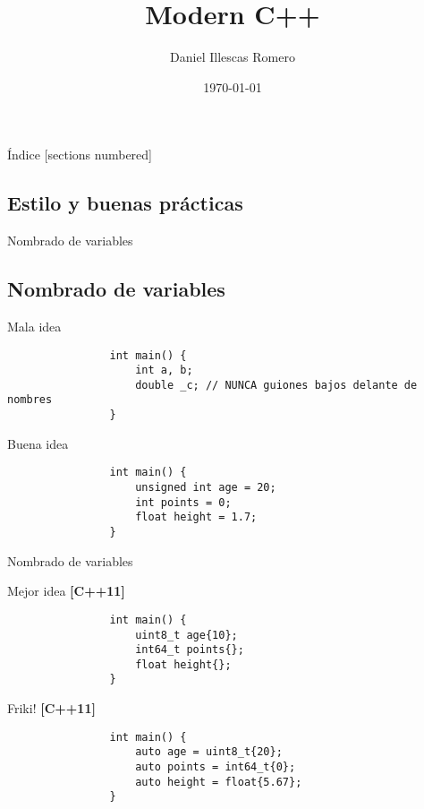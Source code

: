 \documentclass{beamer}
\title{Modern C++}
\author{Daniel Illescas Romero}
\date{\today}
\institute{Universidad de Granada [UGR]}
\newcommand{\normalSizeItem}[1] {
  \normalsize{\item #1}
}
\newcommand{\newFrameWithoutIndex}[1]{
	\begin{frame}
		#1
		\thispagestyle{empty}
	\end{frame}
}
\newcommand{\newSectionWithoutIndex}[1]{
	\newFrameWithoutIndex{\section{#1}}
}
\begin{document}
	\newFrameWithoutIndex{\maketitle}
	
	\begin{frame}{Índice}		
		[sections numbered]
		\tableofcontents
	\end{frame}

	\newSectionWithoutIndex{Estilo y buenas prácticas}
  
		\begin{frame}[fragile]{Nombrado de variables}	
			\subsection{Nombrado de variables}
			\begin{itemize}
			
				\normalSizeItem {Mala idea}
				\begin{lstlisting}
				int main() {
					int a, b;
					double _c; // NUNCA guiones bajos delante de nombres
				}
				\end{lstlisting}
				
				\normalSizeItem {Buena idea}
				\begin{lstlisting}
				int main() {
					unsigned int age = 20;
					int points = 0;
					float height = 1.7;
				}
				\end{lstlisting}
				
			\end{itemize}
		\end{frame}
			 
		\begin{frame}[fragile]{Nombrado de variables}	
			\begin{itemize}
			
				\normalSizeItem{Mejor idea \textbf{[C++11]}}
				\begin{lstlisting}
				int main() {
					uint8_t age{10};
					int64_t points{}; 
					float height{};
				}
				\end{lstlisting}
				
				\normalSizeItem{Friki! \textbf{[C++11]}}
				\begin{lstlisting}
				int main() {
					auto age = uint8_t{20};
					auto points = int64_t{0};
					auto height = float{5.67};
				}
				\end{lstlisting}
				
			\end{itemize}
		\end{frame}
		
\end{document}
